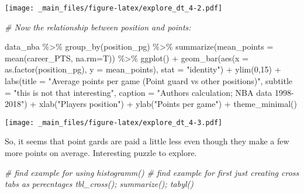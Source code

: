 \documentclass[
]{book}
\newenvironment{Shaded}{\begin{snugshade}}{\end{snugshade}}
\newcommand{\AttributeTok}[1]{\textcolor[rgb]{0.77,0.63,0.00}{#1}}
\newcommand{\CommentTok}[1]{\textcolor[rgb]{0.56,0.35,0.01}{\textit{#1}}}
\newcommand{\DecValTok}[1]{\textcolor[rgb]{0.00,0.00,0.81}{#1}}
\newcommand{\FunctionTok}[1]{\textcolor[rgb]{0.00,0.00,0.00}{#1}}
\newcommand{\NormalTok}[1]{#1}
\newcommand{\SpecialCharTok}[1]{\textcolor[rgb]{0.00,0.00,0.00}{#1}}
\newcommand{\StringTok}[1]{\textcolor[rgb]{0.31,0.60,0.02}{#1}}
\begin{document}
\texttt{[image: \_main\_files/figure-latex/explore\_dt\_4-2.pdf]}

\begin{Shaded}
\begin{Highlighting}[]
\CommentTok{\# Now the relationship between position and points:}

\NormalTok{data\_nba }\SpecialCharTok{\%\textgreater{}\%} 
  \FunctionTok{group\_by}\NormalTok{(position\_pg) }\SpecialCharTok{\%\textgreater{}\%}
  \FunctionTok{summarize}\NormalTok{(}\AttributeTok{mean\_points =} \FunctionTok{mean}\NormalTok{(career\_PTS, }\AttributeTok{na.rm=}\NormalTok{T)) }\SpecialCharTok{\%\textgreater{}\%}
  \FunctionTok{ggplot}\NormalTok{() }\SpecialCharTok{+}
  \FunctionTok{geom\_bar}\NormalTok{(}\FunctionTok{aes}\NormalTok{(}\AttributeTok{x =} \FunctionTok{as.factor}\NormalTok{(position\_pg), }
               \AttributeTok{y =}\NormalTok{ mean\_points),}
           \AttributeTok{stat =} \StringTok{"identity"}\NormalTok{) }\SpecialCharTok{+} 
  \FunctionTok{ylim}\NormalTok{(}\DecValTok{0}\NormalTok{,}\DecValTok{15}\NormalTok{) }\SpecialCharTok{+}
  \FunctionTok{labs}\NormalTok{(}\AttributeTok{title =} \StringTok{"Average points per game (Point guard vs other positions)"}\NormalTok{,}
       \AttributeTok{subtitle =} \StringTok{"this is not that interesting"}\NormalTok{,}
       \AttributeTok{caption =} \StringTok{"Authors\textquotesingle{} calculation; NBA data 1998{-}2018"}\NormalTok{) }\SpecialCharTok{+}
  \FunctionTok{xlab}\NormalTok{(}\StringTok{"Player\textquotesingle{}s position"}\NormalTok{) }\SpecialCharTok{+}
  \FunctionTok{ylab}\NormalTok{(}\StringTok{"Points per game"}\NormalTok{) }\SpecialCharTok{+}
  \FunctionTok{theme\_minimal}\NormalTok{()}
\end{Highlighting}
\end{Shaded}

\texttt{[image: \_main\_files/figure-latex/explore\_dt\_4-3.pdf]}

So, it seems that point gards are paid a little less even though they make a few more points on average. Interesting puzzle to explore.

\begin{Shaded}
\begin{Highlighting}[]
\CommentTok{\# find example for using histogramm()}
\CommentTok{\# find example for first just creating cross tabs as perecntages tbl\_cross(); summarize(); tabyl()}
\end{Highlighting}
\end{Shaded}
\end{document}
